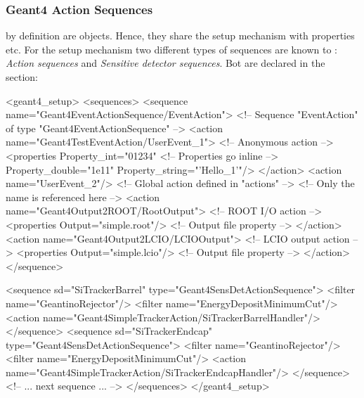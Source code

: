 \documentclass[10pt,a4paper]{article}
\begin{document}
\subsubsection{Geant4 Action Sequences}
\label{sec:ddg4-setup-xml-geant4-sequences}

\noindent
{} by definition are  objects.
Hence, they share the setup mechanism with properties etc. For the setup
mechanism two different types of sequences are known to \DDG:
{\it{Action sequences}} and {\it{Sensitive detector sequences}}. Bot are declared in
the  section:
\begin{code}
<geant4_setup>
  <sequences>
    <sequence name="Geant4EventActionSequence/EventAction"> <!-- Sequence "EventAction" of type
                                                                 "Geant4EventActionSequence" -->
      <action name="Geant4TestEventAction/UserEvent_1">     <!-- Anonymous action                   -->
        <properties Property_int="01234"                    <!-- Properties go inline               -->
            Property_double="1e11"
            Property_string="'Hello_1'"/>
      </action>
      <action name="UserEvent_2"/>                          <!-- Global action defined in "actions" -->
                                                            <!-- Only the name is referenced here   -->
      <action name="Geant4Output2ROOT/RootOutput">          <!-- ROOT I/O action                    -->
        <properties Output="simple.root"/>                  <!-- Output file property               -->
      </action>
      <action name="Geant4Output2LCIO/LCIOOutput">          <!-- LCIO output action                 -->
        <properties Output="simple.lcio"/>                  <!-- Output file property               -->
      </action>
    </sequence>


    <sequence sd="SiTrackerBarrel" type="Geant4SensDetActionSequence">
      <filter name="GeantinoRejector"/>
      <filter name="EnergyDepositMinimumCut"/>
      <action name="Geant4SimpleTrackerAction/SiTrackerBarrelHandler"/>
    </sequence>
    <sequence sd="SiTrackerEndcap" type="Geant4SensDetActionSequence">
      <filter name="GeantinoRejector"/>
      <filter name="EnergyDepositMinimumCut"/>
      <action name="Geant4SimpleTrackerAction/SiTrackerEndcapHandler"/>
    </sequence>
    <!--    ... next sequence ...     -->
  </sequences>
</geant4_setup>
\end{code}
\end{document}
